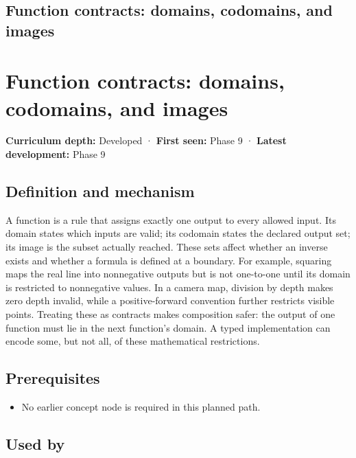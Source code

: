 \hypertarget{appendix-a59658325cd6}{}
\section*{Function contracts: domains, codomains, and images}
\chapter{Function contracts: domains, codomains, and images}\label{appendix-a59658325cd6-function-contracts-domains-codomains-and-images}

\textbf{Curriculum depth:} Developed · \textbf{First seen:} Phase 9 · \textbf{Latest development:} Phase 9

\section{Definition and mechanism}\label{appendix-a59658325cd6-definition-and-mechanism}

A function is a rule that assigns exactly one output to every allowed input. Its domain states which inputs are valid; its codomain states the declared output set; its image is the subset actually reached. These sets affect whether an inverse exists and whether a formula is defined at a boundary. For example, squaring maps the real line into nonnegative outputs but is not one-to-one until its domain is restricted to nonnegative values. In a camera map, division by depth makes zero depth invalid, while a positive-forward convention further restricts visible points. Treating these as contracts makes composition safer: the output of one function must lie in the next function's domain. A typed implementation can encode some, but not all, of these mathematical restrictions.

\section{Prerequisites}\label{appendix-a59658325cd6-prerequisites}

\begin{itemize}
\tightlist
\item
  No earlier concept node is required in this planned path.
\end{itemize}

\section{Used by}\label{appendix-a59658325cd6-used-by}


